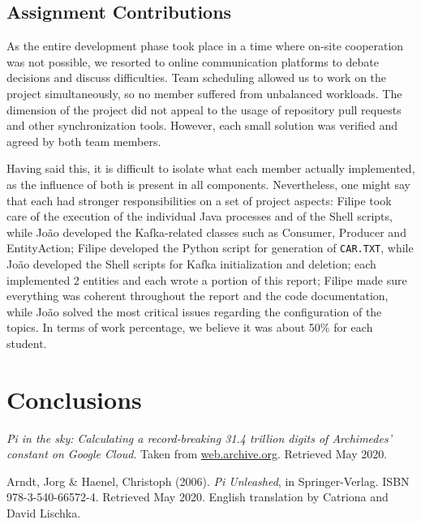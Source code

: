 \documentclass[12pt]{article}
\begin{document}
\subsection{Assignment Contributions} \label{contributions} %

As the entire development phase took place in a time where on-site cooperation was not possible, we resorted to online communication platforms to debate decisions
and discuss difficulties.
Team scheduling allowed us to work on the project simultaneously, so no member suffered from unbalanced workloads.
The dimension of the project did not appeal to the usage of repository pull requests and other synchronization tools.
However, each small solution was verified and agreed by both team members.

Having said this, it is difficult to isolate what each member actually implemented, as the influence of both is present in all components.
Nevertheless, one might say that each had stronger responsibilities on a set of project aspects:
Filipe took care of the execution of the individual Java processes and of the Shell scripts, while João developed the Kafka-related classes such as Consumer,
Producer and EntityAction; Filipe developed the Python script for generation of \texttt{CAR.TXT}, while João developed the Shell scripts for Kafka initialization
and deletion; each implemented 2 entities and each wrote a portion of this report; Filipe made sure everything was coherent throughout the report and the code
documentation, while João solved the most critical issues regarding the configuration of the topics.
In terms of work percentage, we believe it was about 50\% for each student.

\newpage
\section*{Conclusions} \label{conclusions} %

\begin{thebibliography}{9} %
  

  \textit{Pi in the sky: Calculating a record-breaking 31.4 trillion digits of Archimedes' constant on Google Cloud}.
  Taken from \href{https://web.archive.org/web/20191019023120/https://cloud.google.com/blog/products/compute/calculating-31-4-trillion-digits-of-archimedes-constant-on-google-cloud}{web.archive.org}.
  Retrieved May 2020. 

  Arndt, Jorg \& Haenel, Christoph (2006). 
  \textit{Pi Unleashed}, in Springer-Verlag. 
  ISBN 978-3-540-66572-4. 
  Retrieved May 2020. 
  English translation by Catriona and David Lischka.


\end{thebibliography}

\clearpage
\end{document}
